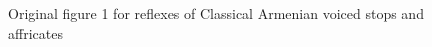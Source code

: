 \begin{figure}
	\centering
	\caption{Original figure 1 for reflexes of Classical Armenian voiced stops and affricates}
	\label{fig:fig1 original}
\end{figure}

